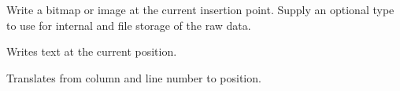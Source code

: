 
Write a bitmap or image at the current insertion point. Supply an optional type to use
for internal and file storage of the raw data.

\label{wxrichtextctrlwritetext}


Writes text at the current position.

\label{wxrichtextctrlxytoposition}


Translates from column and line number to position.

